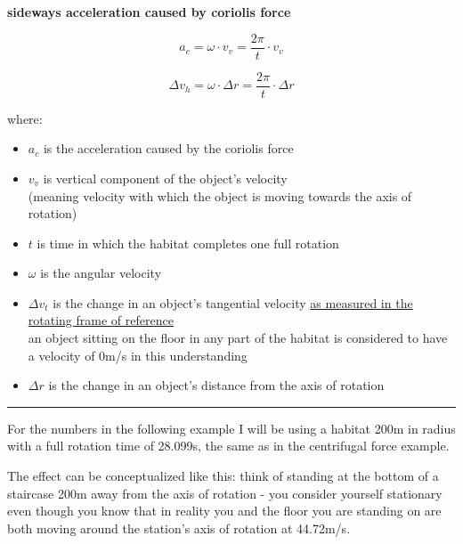 \documentclass[a4paper]{article}
\begin{document}
	\medskip
	
	\begin{center}
		\textbf{sideways acceleration caused by coriolis force}
	\end{center}
	
	$$ a_c = \omega \cdot v_v = \frac{2 \pi}{t} \cdot v_v $$
	
	$$ \Delta v_h = \omega \cdot \Delta r = \frac{2 \pi}{t} \cdot \Delta r $$
	
	where:
	
	\begin{itemize}
		\item $a_c$ is the acceleration caused by the coriolis force
		
		\item $v_v$ is vertical component of the object's velocity\\(meaning velocity with which the object is moving towards the axis of rotation)
		
		\item $t$ is time in which the habitat completes one full rotation
		
		\item $\omega$ is the angular velocity
		
		\item $\Delta v_t$ is the change in an object's tangential velocity \underline{as measured in the rotating frame of reference}\\an object sitting on the floor in any part of the habitat is considered to have a velocity of 0m/s in this understanding
		
		\item $\Delta r$ is the change in an object's distance from the axis of rotation
	\end{itemize}
	
	\medskip
	
	\noindent\rule{\linewidth}{1pt}
	
	\medskip
	
	For the numbers in the following example I will be using a habitat 200m in radius with a full rotation time of 28.099s, the same as in the centrifugal force example.
	
	\medskip
	
	The effect can be conceptualized like this: think of standing at the bottom of a staircase 200m away from the axis of rotation - you consider yourself stationary even though you know that in reality you and the floor you are standing on are both moving around the station's axis of rotation at 44.72m/s.
	
\end{document}
